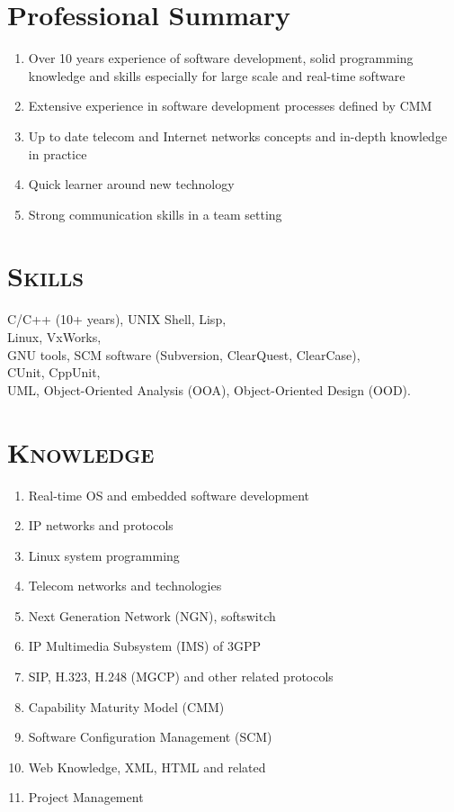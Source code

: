 \documentclass[margin,11pt]{res}
\begin{document}
\begin{resume}
 
\section{Professional Summary}

\begin{enumerate}
    \item Over 10 years experience of software development, solid programming knowledge and
      skills especially for large scale and real-time software
    \item Extensive experience in software development processes defined by CMM
    \item Up to date telecom and Internet networks concepts and in-depth knowledge in practice
    \item Quick learner around new technology
    \item Strong communication skills in a team setting
\end{enumerate}

\section{\textsc{Skills}} 
   C/C++ (10+ years), UNIX Shell, Lisp, \\
   Linux, VxWorks, \\
   GNU tools, SCM software (Subversion, ClearQuest, ClearCase),\\
   CUnit, CppUnit, \\
   UML, Object-Oriented Analysis (OOA), Object-Oriented Design (OOD).

\section{\textsc{Knowledge}} 
\begin{enumerate}
    \item Real-time OS and embedded software development
    \item IP networks and protocols
    \item Linux system programming
    \item Telecom networks and technologies
    \item Next Generation Network (NGN), softswitch
    \item IP Multimedia Subsystem (IMS) of 3GPP
    \item SIP, H.323, H.248 (MGCP) and other related protocols
    \item Capability Maturity Model (CMM)
    \item Software Configuration Management (SCM)
    \item Web Knowledge, XML, HTML and related
    \item Project Management
\end{enumerate}
 

\end{resume}
\end{document}
